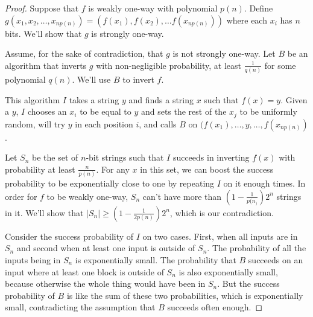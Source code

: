 \begin{proof}
	Suppose that $f$ is weakly one-way with polynomial $p(n)$.  Define $g(x_1,x_2,\dots,x_{np(n)}) = (f(x_1),f(x_2),\dots f(x_{np(n)}))$ where each $x_i$ has $n$ bits.  We'll show that $g$ is strongly one-way.
	
	Assume, for the sake of contradiction, that $g$ is not strongly one-way.  Let $B$ be an algorithm that inverts $g$ with non-negligible probability, at least $\frac{1}{q(n)}$ for some polynomial $q(n)$.  We'll use $B$ to invert $f$.
	
	This algorithm $I$ takes a string $y$ and finds a string $x$ such that $f(x) = y$.  Given a $y$, $I$ chooses an $x_i$ to be equal to $y$ and sets the rest of the $x_j$ to be uniformly random, will try $y$ in each position $i$, and calls $B$ on $(f(x_1),\dots, y, \dots,f(x_{np(n)})$.
	
	Let $S_n$ be the set of $n$-bit strings such that $I$ succeeds in inverting $f(x)$ with probability at least $\frac{n}{p(n)}$.  For any $x$ in this set, we can boost the success probability to be exponentially close to one by repeating $I$ on it enough times.  In order for $f$ to be weakly one-way, $S_n$ can't have more than $(1-\frac{1}{p(n_)})2^n$ strings in it.  We'll show that $|S_n| \geq (1-\frac{1}{2p(n)})2^n$, which is our contradiction.
	
	Consider the success probability of $I$ on two cases.  First, when all inputs are in $S_n$ and second when at least one input is outside of $S_n$. The probability of all the inputs being in $S_n$ is exponentially small.  The probability that $B$ succeeds on an input where at least one block is outside of $S_n$ is also exponentially small, because otherwise the whole thing would have been in $S_n$.  But the success probability of $B$ is like the sum of these two probabilities, which is exponentially small, contradicting the assumption that $B$ succeeds often enough.
\end{proof}